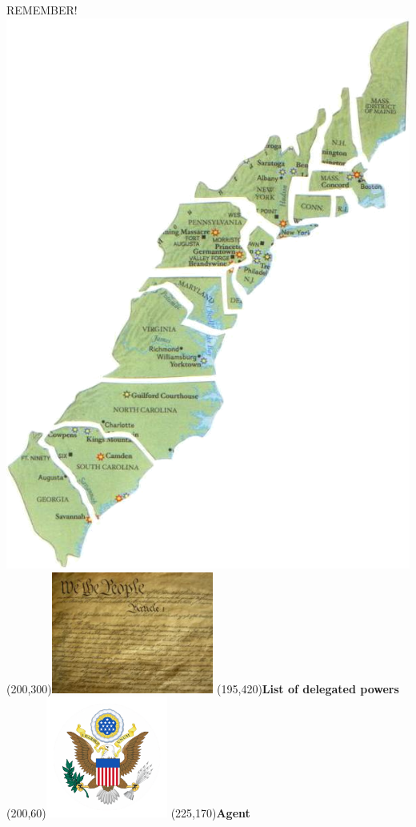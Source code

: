 \begin{frame}{REMEMBER!}
    \includegraphics[height=0.75\textheight]{img/colonies.png} \\
    \Put(200,300){\includegraphics[width=0.4\textwidth]{img/constitution.png}}
    \Put(195,420){\textbf{List of delegated powers}}
    \Put(200,60){\includegraphics[width=0.3\textwidth]{img/national-seal.png}}
    \Put(225,170){\textbf{\Large{Agent}}}
\end{frame}

